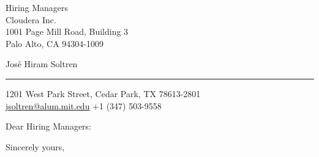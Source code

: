 \documentclass{letter} %
\begin{document}
\signature{Jos\'e Hiram Soltren}           %
\longindentation=0pt                       %
\let\raggedleft\raggedright                %
 
 
\begin{letter}{Hiring Managers\\
Cloudera Inc.\\
1001 Page Mill Road, Building 3\\ 
Palo Alto, CA 94304-1009}
    
\begin{flushleft}
{\LARGE\sffamily Jos\'e Hiram Soltren}
\end{flushleft}
\medskip\hrule height 1pt
\begin{flushright}
\hfill 1201 West Park Street, Cedar Park, TX 78613-2801 \\
\hfill {} \href{mailto:jsoltren@alum.mit.edu}{jsoltren@alum.mit.edu}
         +1 (347) 503-9558
\end{flushright} 
\vfill %

 
\opening{Dear Hiring Managers:} 
 
 
 
 
\closing{Sincerely yours,} 
 

 

\end{letter}
 
\end{document}
